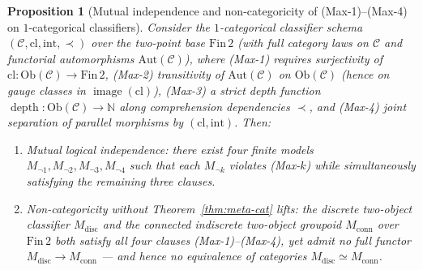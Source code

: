 \documentclass[11pt]{article}
\theoremstyle{plain}
\newtheorem{proposition}[theorem]{Proposition}
\theoremstyle{definition}
\newcommand{\Ob}{\mathrm{Ob}}
\DeclareMathOperator{\image}{image}
\DeclareMathOperator{\dep}{depth}
\begin{document}
\begin{proposition}[Mutual independence and non-categoricity of (Max-1)--(Max-4) on $1$-categorical classifiers]\label{prop:max-independence-noncat}
Consider the $1$-categorical classifier schema $(\mathcal{C}, \mathrm{cl}, \mathrm{int}, \prec)$ over the two-point base $\mathrm{Fin}\,2$ (with full category laws on $\mathcal{C}$ and functorial automorphisms $\mathrm{Aut}(\mathcal{C})$), where (Max-1) requires surjectivity of $\mathrm{cl} : \Ob(\mathcal{C}) \to \mathrm{Fin}\,2$, (Max-2) transitivity of $\mathrm{Aut}(\mathcal{C})$ on $\Ob(\mathcal{C})$ (hence on gauge classes in $\image(\mathrm{cl})$), (Max-3) a strict depth function $\dep : \Ob(\mathcal{C}) \to \mathbb{N}$ along comprehension dependencies $\prec$, and (Max-4) joint separation of parallel morphisms by $(\mathrm{cl}, \mathrm{int})$. Then:
\begin{enumerate}[nosep,label=(\roman*)]
\item \emph{Mutual logical independence}: there exist four finite models $M_{\neg 1}, M_{\neg 2}, M_{\neg 3}, M_{\neg 4}$ such that each $M_{\neg k}$ violates \textup{(Max-$k$)} while simultaneously satisfying the remaining three clauses.
\item \emph{Non-categoricity without Theorem~\ref{thm:meta-cat} lifts}: the discrete two-object classifier $M_{\mathrm{disc}}$ and the connected indiscrete two-object groupoid $M_{\mathrm{conn}}$ over $\mathrm{Fin}\,2$ both satisfy all four clauses \textup{(Max-1)--(Max-4)}, yet admit no full functor $M_{\mathrm{disc}} \to M_{\mathrm{conn}}$ --- and hence no equivalence of categories $M_{\mathrm{disc}} \simeq M_{\mathrm{conn}}$.
\end{enumerate}
\end{proposition}
\end{document}
